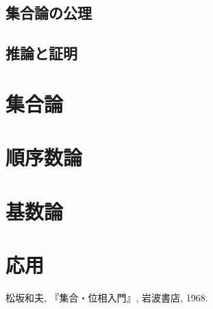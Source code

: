 \documentclass[a4paper]{bxjsarticle}
\theoremstyle{definition}
\begin{document}
    \subsection{集合論の公理}
    \subsection{推論と証明}
    
    \section{集合論}
    \section{順序数論}
    \section{基数論}
    \section{応用}
    \begin{thebibliography}{9}
     松坂和夫, 『集合・位相入門』, 岩波書店, 1968.
    
    
    \end{thebibliography}
\end{document}

